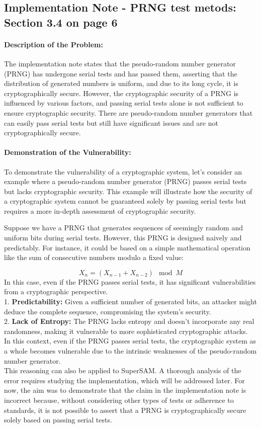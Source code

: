 \documentclass[12pt]{article}
\begin{document}
    
\subsection{Implementation Note - PRNG test metods: Section 3.4 on page 6} 
    \paragraph{Description of the Problem:} The implementation note states that the pseudo-random number generator (PRNG) has undergone serial tests and has passed them, asserting that the distribution of generated numbers is uniform, and due to its long cycle, it is cryptographically secure.
    However, the cryptographic security of a PRNG is influenced by various factors, and passing serial tests alone is not sufficient to ensure cryptographic security. There are pseudo-random number generators that can easily pass serial tests but still have significant issues and are not cryptographically secure.

    \paragraph{Demonstration of the Vulnerability:}
    To demonstrate the vulnerability of a cryptographic system, let's consider an example where a pseudo-random number generator (PRNG) passes serial tests but lacks cryptographic security. This example will illustrate how the security of a cryptographic system cannot be guaranteed solely by passing serial tests but requires a more in-depth assessment of cryptographic security.

    Suppose we have a PRNG that generates sequences of seemingly random and uniform bits during serial tests. However, this PRNG is designed naively and predictably. For instance, it could be based on a simple mathematical operation like the sum of consecutive numbers modulo a fixed value:

    \[ X_n = (X_{n-1} + X_{n-2}) \mod M \]
    In this case, even if the PRNG passes serial tests, it has significant vulnerabilities from a cryptographic perspective.
    \\
    1. \textbf{Predictability:} Given a sufficient number of generated bits, an attacker might deduce the complete sequence, compromising the system's security.
    \\
    2. \textbf{Lack of Entropy:} The PRNG lacks entropy and doesn't incorporate any real randomness, making it vulnerable to more sophisticated cryptographic attacks.
    \\
    In this context, even if the PRNG passes serial tests, the cryptographic system as a whole becomes vulnerable due to the intrinsic weaknesses of the pseudo-random number generator.
    \\
    This reasoning can also be applied to SuperSAM. A thorough analysis of the error requires studying the implementation, which will be addressed later. For now, the aim was to demonstrate that the claim in the implementation note is incorrect because, without considering other types of tests or adherence to standards, it is not possible to assert that a PRNG is cryptographically secure solely based on passing serial tests.
\end{document}
